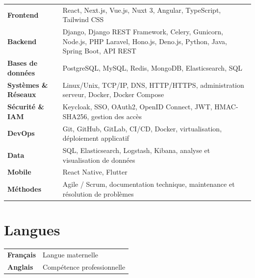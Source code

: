 \documentclass[11pt,a4paper]{article}
\begin{document}
\begin{tabularx}{\linewidth}{
    @{}
    >{\bfseries}l
    @{\hspace{14pt}}
    X
    @{}
}

Frontend &
React, Next.js, Vue.js, Nuxt 3, Angular,
TypeScript, Tailwind CSS \\[4pt]

Backend &
Django, Django REST Framework, Celery, Gunicorn,
Node.js, PHP Laravel, Hono.js, Deno.js,
Python, Java, Spring Boot, API REST \\[4pt]

Bases de données &
PostgreSQL, MySQL, Redis, MongoDB, Elasticsearch,
SQL \\[4pt]

Systèmes \& Réseaux &
Linux/Unix, TCP/IP, DNS, HTTP/HTTPS,
administration serveur, Docker, Docker Compose \\[4pt]

Sécurité \& IAM &
Keycloak, SSO, OAuth2, OpenID Connect,
JWT, HMAC-SHA256, gestion des accès \\[4pt]

DevOps &
Git, GitHub, GitLab, CI/CD, Docker,
virtualisation, déploiement applicatif \\[4pt]

Data &
SQL, Elasticsearch, Logstash, Kibana,
analyse et visualisation de données \\[4pt]

Mobile &
React Native, Flutter \\[4pt]

Méthodes &
Agile / Scrum, documentation technique,
maintenance et résolution de problèmes

\end{tabularx}

\vspace{6pt}

\section{Langues}

\begin{tabularx}{\linewidth}{
    @{}
    >{\bfseries}l
    @{\hspace{14pt}}
    X
    @{}
}

Français &
Langue maternelle \\[3pt]

Anglais &
Compétence professionnelle

\end{tabularx}
\end{document}
